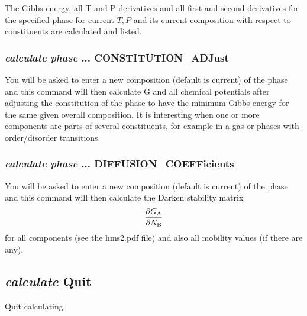\documentclass[12pt]{article}
\begin{document}
The Gibbs energy, all T and P derivatives and all first and second
derivatives for the specified phase for current $T,P$ and its current
composition with respect to constituents are calculated and listed.

\subsubsection{{\em calculate phase} ... CONSTITUTION\_ADJust}

You will be asked to enter a new composition (default is current) of
the phase and this command will then calculate G and all chemical
potentials after adjusting the constitution of the phase to have the
minimum Gibbs energy for the same given overall composition.  It is
interesting when one or more components are parts of several
constituents, for example in a gas or phases with order/disorder
transitions.

\subsubsection{{\em calculate phase} ... DIFFUSION\_COEFFicients}

You will be asked to enter a new composition (default is current) of
the phase and this command will then calculate the Darken stability
matrix
\begin{eqnarray}
  \frac{\partial G_{\rm A}}{\partial N_{\rm B}} \nonumber
\end{eqnarray}
for all components (see the hms2.pdf file) and also all mobility
values (if there are any).

\subsection{{\em calculate} Quit}

Quit calculating.
\end{document}
